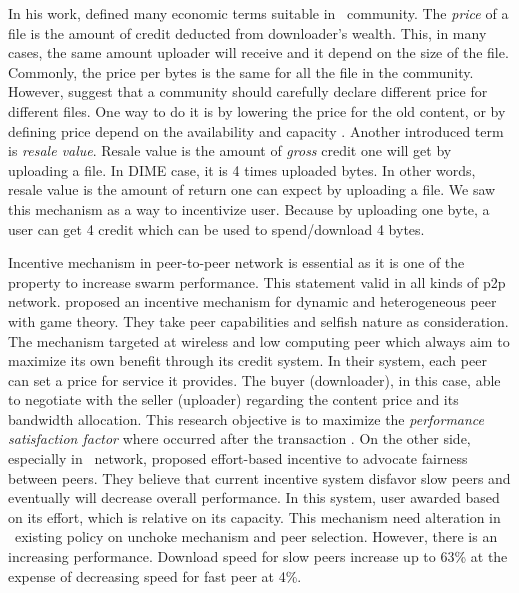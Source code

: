 In his work, \citeauthor{2012:economicbt:kash} defined many economic terms suitable in \bt~community. The \textit{price} of a file is the amount of credit deducted from downloader's wealth. This, in many cases, the same amount uploader will receive and it depend on the size of the file. Commonly, the price per bytes is the same for all the file in the community. However, \citeauthor{2012:economicbt:kash} suggest that a community should carefully declare different price for different files. One way to do it is by lowering the price for the old content, or by defining price depend on the availability and capacity \cite{2012:economicbt:kash}. Another introduced term is \textit{resale value}. Resale value is the amount of \textit{gross} credit one will get by uploading a file. In DIME case, it is 4 times uploaded bytes. In other words, resale value is the amount of return one can expect by uploading a file. We saw this mechanism as a way to incentivize user. Because by uploading one byte, a user can get 4 credit which can be used to spend/download 4 bytes.

Incentive mechanism in peer-to-peer network is essential as it is one of the property to increase swarm performance. This statement valid in all kinds of p2p network. \citeauthor{2015:incentivep2pgame:kang} proposed an incentive mechanism for dynamic and heterogeneous peer with game theory. They take peer capabilities and selfish nature as consideration. The mechanism targeted at wireless and low computing peer which always aim to maximize its own benefit through its credit system. In their system, each peer can set a price for service it provides. The buyer (downloader), in this case, able to negotiate with the seller (uploader) regarding the content price and its bandwidth allocation. This research objective is to maximize the \textit{performance satisfaction factor} where occurred after the transaction \cite{2015:incentivep2pgame:kang}. On the other side, especially in \bt~network, \citeauthor{2010:effortincentive:rahman} proposed effort-based incentive to advocate fairness between peers. They believe that current incentive system disfavor slow peers and eventually will decrease overall performance. In this system, user awarded based on its effort, which is relative on its capacity. This mechanism need alteration in \bt~existing policy on unchoke mechanism and peer selection. However, there is an increasing performance. Download speed for slow peers increase up to 63\% at the expense of decreasing speed for fast peer at 4\%.

